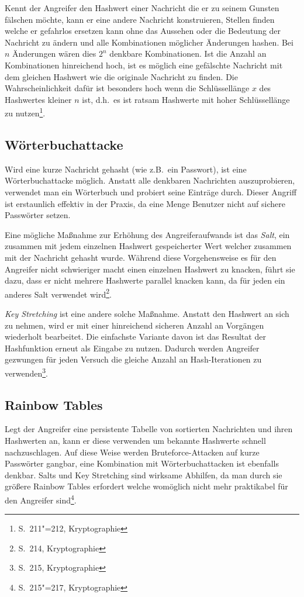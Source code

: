 Kennt der Angreifer den Hashwert einer Nachricht die er zu seinem
Gunsten fälschen möchte, kann er eine andere Nachricht konstruieren,
Stellen finden welche er gefahrlos ersetzen kann ohne das Aussehen
oder die Bedeutung der Nachricht zu ändern und alle Kombinationen
möglicher Änderungen hashen.  Bei $n$ Änderungen wären dies $2^n$
denkbare Kombinationen.  Ist die Anzahl an Kombinationen hinreichend
hoch, ist es möglich eine gefälschte Nachricht mit dem gleichen
Hashwert wie die originale Nachricht zu finden.  Die
Wahrscheinlichkeit dafür ist besonders hoch wenn die Schlüssellänge
$x$ des Hashwertes kleiner $n$ ist, d.h.~es ist ratsam Hashwerte mit
hoher Schlüssellänge zu nutzen\footnote{S.~211"=212, Kryptographie}.

\subsection{Wörterbuchattacke}

Wird eine kurze Nachricht gehasht (wie z.B.~ein Passwort), ist eine
Wörterbuchattacke möglich.  Anstatt alle denkbaren Nachrichten
auszuprobieren, verwendet man ein Wörterbuch und probiert seine
Einträge durch.  Dieser Angriff ist erstaunlich effektiv in der
Praxis, da eine Menge Benutzer nicht auf sichere Passwörter setzen.

Eine mögliche Maßnahme zur Erhöhung des Angreiferaufwands ist das
\emph{Salt}, ein zusammen mit jedem einzelnen Hashwert gespeicherter
Wert welcher zusammen mit der Nachricht gehasht wurde.  Während diese
Vorgehensweise es für den Angreifer nicht schwieriger macht einen
einzelnen Hashwert zu knacken, führt sie dazu, dass er nicht mehrere
Hashwerte parallel knacken kann, da für jeden ein anderes Salt
verwendet wird\footnote{S.~214, Kryptographie}.

\emph{Key Stretching} ist eine andere solche Maßnahme.  Anstatt den
Hashwert an sich zu nehmen, wird er mit einer hinreichend sicheren
Anzahl an Vorgängen wiederholt bearbeitet.  Die einfachste Variante
davon ist das Resultat der Hashfunktion erneut als Eingabe zu nutzen.
Dadurch werden Angreifer gezwungen für jeden Versuch die gleiche
Anzahl an Hash-Iterationen zu verwenden\footnote{S.~215,
  Kryptographie}.

\subsection{Rainbow Tables}

Legt der Angreifer eine persistente Tabelle von sortierten Nachrichten
und ihren Hashwerten an, kann er diese verwenden um bekannte Hashwerte
schnell nachzuschlagen.  Auf diese Weise werden Bruteforce-Attacken
auf kurze Passwörter gangbar, eine Kombination mit Wörterbuchattacken
ist ebenfalls denkbar.  Salts und Key Stretching sind wirksame
Abhilfen, da man durch sie größere Rainbow Tables erfordert welche
womöglich nicht mehr praktikabel für den Angreifer
sind\footnote{S.~215"=217, Kryptographie}.

